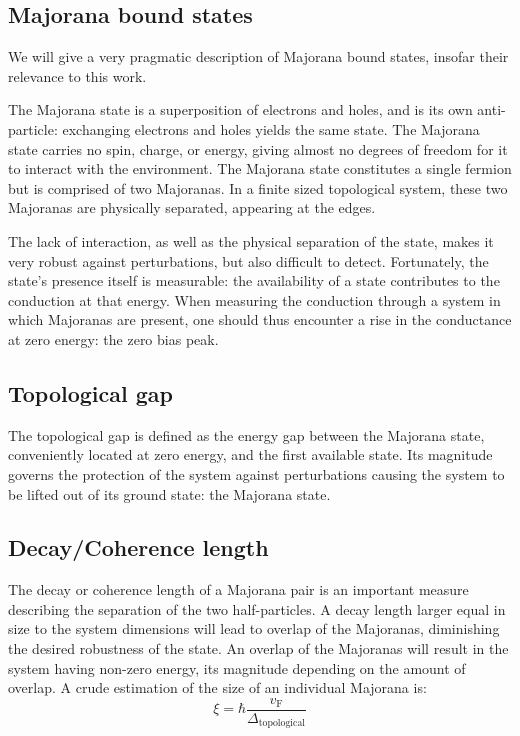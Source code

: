    \subsection{Majorana bound states}
        We will give a very pragmatic description of Majorana bound states, insofar their relevance to this work.

        The Majorana state is a superposition of electrons and holes, and is its own anti-particle: exchanging electrons and holes yields the same state.
        The Majorana state carries no spin, charge, or energy, giving almost no degrees of freedom for it to interact with the environment.
        The Majorana state constitutes a single fermion but is comprised of two Majoranas.
        In a finite sized topological system, these two Majoranas are physically separated, appearing at the edges.

        The lack of interaction, as well as the physical separation of the state, makes it very robust against perturbations, but also difficult to detect.
        Fortunately, the state's presence itself is measurable: the availability of a state contributes to the conduction at that energy.
        When measuring the conduction through a system in which Majoranas are present, one should thus encounter a rise in the conductance at zero energy: the zero bias peak.

    \subsection{Topological gap}
        The topological gap is defined as the energy gap between the Majorana state, conveniently located at zero energy, and the first available state.
        Its magnitude governs the protection of the system against perturbations causing the system to be lifted out of its ground state: the Majorana state.

    \subsection{Decay/Coherence length}
        The decay or coherence length of a Majorana pair is an important measure describing the separation of the two half-particles.
        A decay length larger equal in size to the system dimensions will lead to overlap of the Majoranas, diminishing the desired robustness of the state.
        An overlap of the Majoranas will result in the system having non-zero energy, its magnitude depending on the amount of overlap.
        A crude estimation of the size of an individual Majorana is:
        \begin{equation}
            \xi = \hbar \frac{v_\text{F}}{\Delta_\text{topological}}
            \label{eq:majorana_coherence_length}
        \end{equation}

